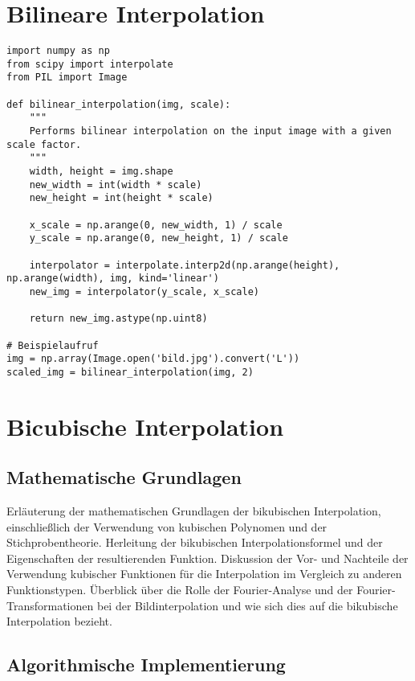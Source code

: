 \section{Bilineare Interpolation}
\begin{lstlisting}
import numpy as np
from scipy import interpolate
from PIL import Image

def bilinear_interpolation(img, scale):
    """
    Performs bilinear interpolation on the input image with a given scale factor.
    """
    width, height = img.shape
    new_width = int(width * scale)
    new_height = int(height * scale)
    
    x_scale = np.arange(0, new_width, 1) / scale
    y_scale = np.arange(0, new_height, 1) / scale
    
    interpolator = interpolate.interp2d(np.arange(height), np.arange(width), img, kind='linear')
    new_img = interpolator(y_scale, x_scale)
    
    return new_img.astype(np.uint8)

# Beispielaufruf
img = np.array(Image.open('bild.jpg').convert('L'))
scaled_img = bilinear_interpolation(img, 2)
\end{lstlisting}

\section{Bicubische Interpolation}

    \subsection{Mathematische Grundlagen}

    Erläuterung der mathematischen Grundlagen der bikubischen Interpolation, einschließlich der Verwendung von kubischen Polynomen und der Stichprobentheorie.
    Herleitung der bikubischen Interpolationsformel und der Eigenschaften der resultierenden Funktion.
    Diskussion der Vor- und Nachteile der Verwendung kubischer Funktionen für die Interpolation im Vergleich zu anderen Funktionstypen.
    Überblick über die Rolle der Fourier-Analyse und der Fourier-Transformationen bei der Bildinterpolation und wie sich dies auf die bikubische Interpolation bezieht.

    \subsection{Algorithmische Implementierung}


